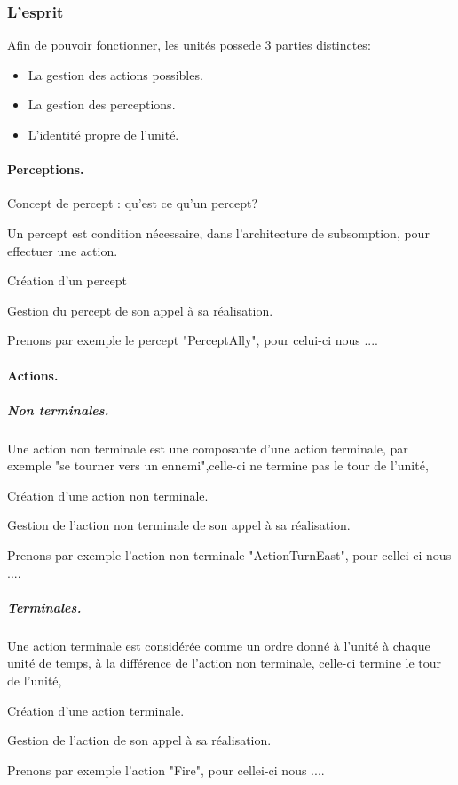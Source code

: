\documentclass{report}
\begin{document}
\subsubsection{L'esprit}
Afin de pouvoir fonctionner, les unités possede 3 parties distinctes: 
\begin{itemize}
\item La gestion des actions possibles.
\item La gestion des perceptions.
\item L'identité propre de l'unité.
\end{itemize}

\paragraph{Perceptions.}
Concept de percept : qu'est ce qu'un percept?

Un percept est condition nécessaire, dans l'architecture de subsomption, pour effectuer une action.

Création d'un percept

Gestion du percept de son appel à sa réalisation.

Prenons par exemple le percept "PerceptAlly", pour celui-ci nous ....

\paragraph{Actions.}

\subparagraph{Non terminales.}

Une action non terminale est une composante d'une action terminale, par exemple "se tourner vers un ennemi",celle-ci ne termine pas le tour de l'unité, 

Création d'une action non terminale.

Gestion de l'action non terminale de son appel à sa réalisation.

Prenons par exemple l'action non terminale "ActionTurnEast", pour cellei-ci nous ....

\subparagraph{Terminales.}

Une action terminale est considérée comme un ordre donné à l'unité à chaque unité de temps, à la différence de l'action non terminale, celle-ci termine le tour de l'unité, 

Création d'une action terminale.

Gestion de l'action de son appel à sa réalisation.

Prenons par exemple l'action "Fire", pour cellei-ci nous ....
\end{document}
